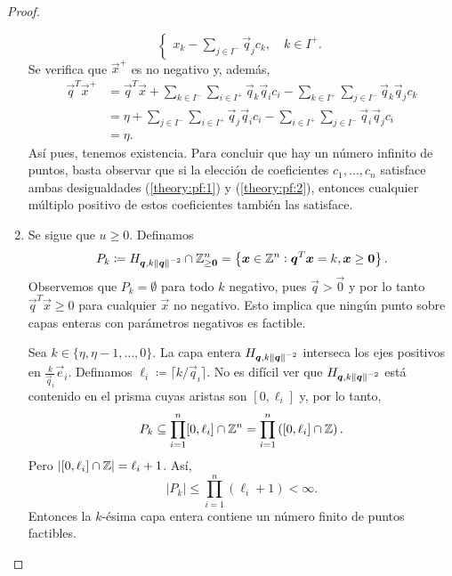 \begin{proof}
\begin{enumerate}
\begin{equation*}
\begin{cases}
					x_k - \sum_{j \in I^-}\vec{q}_jc_k, \quad k \in I^+.
				\end{cases}
			\end{equation*}
			Se verifica que $\vec{x}^+$ es no negativo y, además,
			\begin{align*}
				\vec{q}^T\vec{x}^+
				&= \vec{q}^T\vec{x}
				+ \sum_{k \in I^-}\sum_{i \in I^+}\vec{q}_k\vec{q}_ic_i
				- \sum_{k \in I^+}\sum_{j \in I^-}\vec{q}_k\vec{q}_jc_k \\
				&= \eta
				+ \sum_{j \in I^-}\sum_{i \in I^+}\vec{q}_j\vec{q}_ic_i
				- \sum_{i \in I^+}\sum_{j \in I^-}\vec{q}_i\vec{q}_jc_i \\
				&= \eta.
			\end{align*}
			Así pues, tenemos existencia. Para concluir que hay un número infinito de puntos, basta
			observar que si la elección de coeficientes $c_1, \ldots, c_n$ satisface ambas
			desigualdades (\ref{theory:pf:1}) y (\ref{theory:pf:2}), entonces cualquier múltiplo
			positivo de estos coeficientes también las satisface.
		\item Se sigue que $u \geq 0$. Definamos
			\begin{equation}
				\label{theory:pf:p_k}
				P_k \coloneq H_{\boldsymbol{q}, k\left\lVert \boldsymbol{q} \right\rVert^{-2}} \cap \mathbb{Z}_{\geq \boldsymbol{0}}^n
				= \left\lbrace \boldsymbol{x} \in \mathbb{Z}^n \vcentcolon \boldsymbol{q}^T\boldsymbol{x} = k,
					\boldsymbol{x} \geq \boldsymbol{0} \right\rbrace.
			\end{equation}
			Observemos que $P_k = \emptyset$ para todo $k$ negativo, pues $\vec{q} > \vec{0}$ y por
			lo tanto $\vec{q}^T\vec{x} \geq 0$ para cualquier $\vec{x}$ no negativo. Esto implica que
			ningún punto sobre capas enteras con parámetros negativos es factible.

			Sea $k \in \lbrace \eta, \eta - 1, \ldots, 0 \rbrace$. La capa entera $H_{\boldsymbol{q},
			k\left\lVert \boldsymbol{q} \right\rVert^{-2}}$ interseca los ejes positivos en $\frac{k}{\vec{q}_i}\vec{e}_i$.
			Definamos $\ell_i \coloneq \lceil k/\vec{q}_i \rceil$. No es difícil ver que
			$H_{\boldsymbol{q}, k\left\lVert \boldsymbol{q} \right\rVert^{-2}}$ está contenido en el prisma cuyas aristas son $[0,
			\ell_i]$ y, por lo tanto,
			\begin{equation*}
				P_k \subseteq \prod_{i = 1}^{n} [0, \ell_i] \cap \mathbb{Z}^n = \prod_{i = 1}^{n}
				\left( [0, \ell_i] \cap \mathbb{Z} \right).
			\end{equation*}
			Pero $\left| [0, \ell_i] \cap \mathbb{Z} \right| = \ell_i + 1$. Así,
			\begin{equation*}
				|P_k| \leq \prod_{i = 1}^{n} (\ell_i + 1) < \infty.
			\end{equation*}
			Entonces la $k$-ésima capa entera contiene un número finito de puntos factibles.
	\end{enumerate}
\end{proof}
